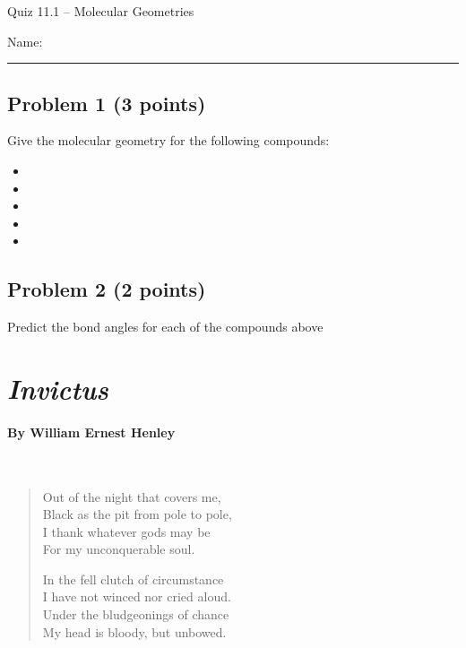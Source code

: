 \documentclass[11pt, letterpaper]{memoir}
\begin{document}
	\begin{center}
		{\large	Quiz 11.1 -- Molecular Geometries}
	\end{center}
{\large Name: \rule[-1mm]{4in}{.1pt}
	
	\subsection*{Problem 1 (3 points)}
	Give the molecular geometry for the following compounds:
	
	\begin{itemize}
		\item {}
		\item \vspace{3em} 
		\item \vspace{3em} 
		\item \vspace{3em} 
		\item \vspace{3em} 
	\end{itemize}

	\vspace{2.25em}
	\subsection*{Problem 2 (2 points)}
	Predict the bond angles for each of the compounds above
\newpage
\pagestyle{empty}
\addtocounter{page}{-1}
\section*{\emph{Invictus}}
\paragraph{By William Ernest Henley}~
\begin{verse}
	Out of the night that covers me,\\
	\hspace{1em}Black as the pit from pole to pole,\\
	I thank whatever gods may be\\
	\hspace{1em}For my unconquerable soul.

	In the fell clutch of circumstance\\
	\hspace{1em}I have not winced nor cried aloud.\\
	Under the bludgeonings of chance\\
	\hspace{1em}My head is bloody, but unbowed.


\end{verse}}
\end{document}
